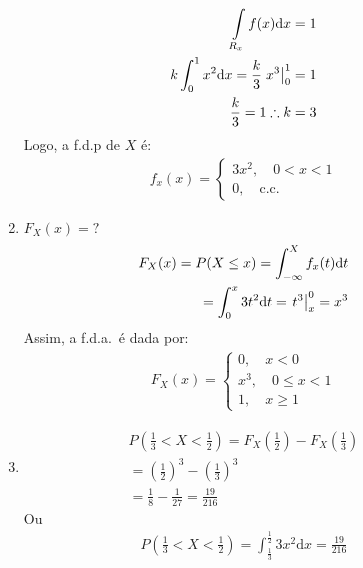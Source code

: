 \begin{description}
\begin{enumerate}[label=(\alph*)]
             \begin{align*}
               \int \limits_{R_x} f(x) \mathrm{d}x =1 \\
               k \int_{0}^{1} x^2 \mathrm{d}x = \frac{k}{3} \left.x^3\right\rvert_{0}^{1} = 1 \\
               \frac{k}{3}=1 \therefore k=3
             \end{align*}
             Logo, a f.d.p de $X$ é:
             \begin{align*}
               f_x(x)= \begin{cases}
                 3x^2, \quad 0<x<1 \\
                 0 , \quad \text{c.c.\ }
               \end{cases}
             \end{align*}
           \item  ${F}_{X} (x)= ?$
             \begin{align*}
               F_{X}(x)= P(X \leq x)= \int_{-\infty}^{X} f_{x} (t) \mathrm{d}t \\
               = \int^{x}_{0} 3 t^2 \mathrm{d}t
               = \left.t^3\right\rvert_{{x}}^{{0}}= x^3
             \end{align*}
             Assim, a f.d.a.\ é dada por:
             \begin{align*}
               F_X(x)= \begin{cases}
                 0 , \quad  x<0\\
                 x^3, \quad 0 \leq x<1 \\
                 1 , \quad x \geq 1 
               \end{cases}
             \end{align*}
           \item 
             \begin{align*}
               P\left( \frac{1}{3}< X < \frac{1}{2} \right)= F_{X} \left(\frac{1}{2}\right) - F_{X} \left(\frac{1}{3}\right)\\
               = \left(\frac{1}{2}\right)^3 - \left(\frac{1}{3}\right)^3 \\
               = \frac{1}{8} - \frac{1}{27} = \frac{19}{216}
             \end{align*}
             Ou 
             \begin{align*}
               P \left( \frac{1}{3} < X < \frac{1}{2} \right)= \int_{\frac{1}{3}}^{\frac{1}{2}} 3x^2 \mathrm{d}x = \frac{19}{216}
               \end{align*}
           \end{enumerate}

\end{description}
